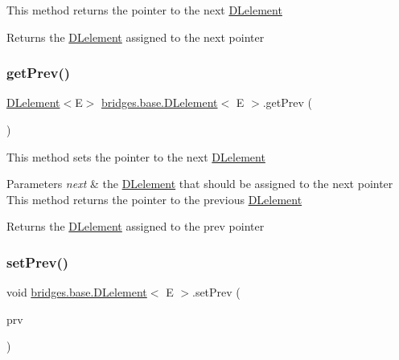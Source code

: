 This method returns the pointer to the next \mbox{\hyperlink{classbridges_1_1base_1_1_d_lelement}{D\+Lelement}}

\begin{DoxyReturn}{Returns}
the \mbox{\hyperlink{classbridges_1_1base_1_1_d_lelement}{D\+Lelement}} assigned to the next pointer 
\end{DoxyReturn}
\mbox{\label{classbridges_1_1base_1_1_d_lelement_a859f08f38513ecdfff0eb11bd2b98ce7}} 
\subsubsection{\texorpdfstring{get\+Prev()}{getPrev()}}
{\footnotesize\ttfamily \mbox{\hyperlink{classbridges_1_1base_1_1_d_lelement}{D\+Lelement}}$<$E$>$ \mbox{\hyperlink{classbridges_1_1base_1_1_d_lelement}{bridges.\+base.\+D\+Lelement}}$<$ E $>$.get\+Prev (\begin{DoxyParamCaption}{ }\end{DoxyParamCaption})}

This method sets the pointer to the next \mbox{\hyperlink{classbridges_1_1base_1_1_d_lelement}{D\+Lelement}}


\begin{DoxyParams}{Parameters}
{\em next} & the \mbox{\hyperlink{classbridges_1_1base_1_1_d_lelement}{D\+Lelement}} that should be assigned to the next pointer This method returns the pointer to the previous \mbox{\hyperlink{classbridges_1_1base_1_1_d_lelement}{D\+Lelement}}\\
\hline
\end{DoxyParams}
\begin{DoxyReturn}{Returns}
the \mbox{\hyperlink{classbridges_1_1base_1_1_d_lelement}{D\+Lelement}} assigned to the prev pointer 
\end{DoxyReturn}
\mbox{\label{classbridges_1_1base_1_1_d_lelement_a152a06add922290d48b2d4affc87d592}} 
\subsubsection{\texorpdfstring{set\+Prev()}{setPrev()}}
{\footnotesize\ttfamily void \mbox{\hyperlink{classbridges_1_1base_1_1_d_lelement}{bridges.\+base.\+D\+Lelement}}$<$ E $>$.set\+Prev (\begin{DoxyParamCaption}\item[{\mbox{\hyperlink{classbridges_1_1base_1_1_d_lelement}{D\+Lelement}}$<$ E $>$}]{prv }\end{DoxyParamCaption})}

